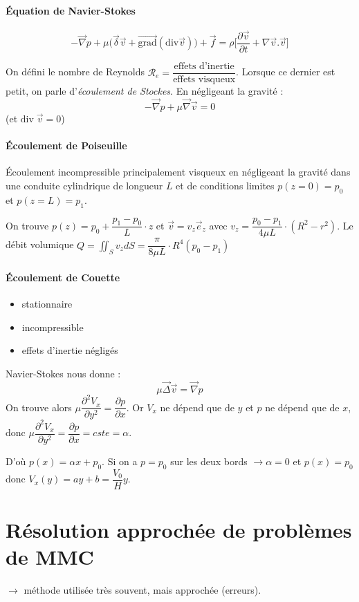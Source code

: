 \documentclass{article}
\begin{document}
\paragraph{Équation de Navier-Stokes}
\[-\vec{\nabla}p + \mu \Big(\vec{\delta}\vec{v} + \overrightarrow{\text{grad}} (\text{div} \vec{v})\Big) + \vec{f} = \rho \Big[\dfrac{\partial \vec{v}}{\partial t} + \nabla \vec{v}.\vec{v}\Big] \]

On défini le nombre de Reynolds $\mathcal{R}_e = \dfrac{\text{effets d'inertie}}{\text{effets visqueux}}$. Lorsque ce dernier est petit, on parle d'\emph{écoulement de Stockes}. En négligeant la gravité :
\[-\vec{\nabla}p+\mu\vec{\nabla}\vec{v}=0\]
(et $\text{div}\; \vec{v}=0$)


\paragraph{Écoulement de Poiseuille}
Écoulement incompressible principalement visqueux en négligeant la gravité dans une conduite cylindrique de longueur $L$ et de conditions limites $p(z=0)=p_0$ et $p(z=L)=p_1$.

On trouve $p(z)= p_0 + \dfrac{p_1-p_0}{L}\cdot z$ et $\vec{v}=v_z \vec{e}_z$ avec $v_z=\dfrac{p_0-p_1}{4\mu L}\cdot (R^2-r^2)$. Le débit volumique $Q=\iint_{S} v_z dS = \dfrac{\pi}{8\mu L}\cdot R^4 (p_0-p_1)$

\paragraph{Écoulement de Couette}
\begin{itemize}[label=$\star$]
\item stationnaire
\item incompressible
\item effets d'inertie négligés
\end{itemize}

Navier-Stokes nous donne :
\[\mu \vec{\Delta}\vec{v} = \vec{\nabla}p\]
On trouve alors $\mu \dfrac{\partial^2 V_x}{\partial y ^2}=\dfrac{\partial p}{\partial x}$. Or $V_x$ ne dépend que de $y$ et $p$ ne dépend que de $x$, donc $\mu \dfrac{\partial^2 V_x}{\partial y ^2}=\dfrac{\partial p}{\partial x} = cste = \alpha$.

D'où $p(x) = \alpha x +p_0$. Si on a $p=p_0$ sur les deux bords $\to \alpha = 0$ et $p(x)=p_0$ donc $V_x(y)=ay+b = \dfrac{V_0}{H}y$.


\section{Résolution approchée de problèmes de MMC}
$\to$ méthode utilisée très souvent, mais approchée (erreurs).
\end{document}
